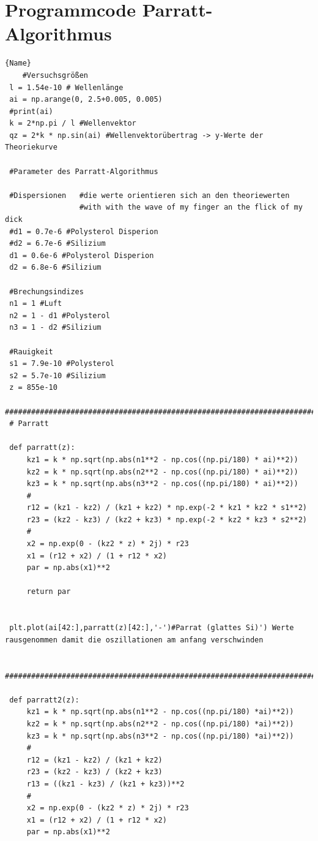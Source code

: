 \section{Programmcode Parratt-Algorithmus}
\begin{lstlisting}{Name}
    #Versuchsgrößen
 l = 1.54e-10 # Wellenlänge
 ai = np.arange(0, 2.5+0.005, 0.005)
 #print(ai)
 k = 2*np.pi / l #Wellenvektor
 qz = 2*k * np.sin(ai) #Wellenvektorübertrag -> y-Werte der Theoriekurve
 
 #Parameter des Parratt-Algorithmus
 
 #Dispersionen   #die werte orientieren sich an den theoriewerten
                 #with with the wave of my finger an the flick of my dick
 #d1 = 0.7e-6 #Polysterol Disperion
 #d2 = 6.7e-6 #Silizium 
 d1 = 0.6e-6 #Polysterol Disperion
 d2 = 6.8e-6 #Silizium 
 
 #Brechungsindizes
 n1 = 1 #Luft
 n2 = 1 - d1 #Polysterol
 n3 = 1 - d2 #Silizium
 
 #Rauigkeit
 s1 = 7.9e-10 #Polysterol 
 s2 = 5.7e-10 #Silizium 
 z = 855e-10 
 ########################################################################################################
 # Parratt
 
 def parratt(z):
     kz1 = k * np.sqrt(np.abs(n1**2 - np.cos((np.pi/180) * ai)**2))
     kz2 = k * np.sqrt(np.abs(n2**2 - np.cos((np.pi/180) * ai)**2))
     kz3 = k * np.sqrt(np.abs(n3**2 - np.cos((np.pi/180) * ai)**2))
     #
     r12 = (kz1 - kz2) / (kz1 + kz2) * np.exp(-2 * kz1 * kz2 * s1**2)
     r23 = (kz2 - kz3) / (kz2 + kz3) * np.exp(-2 * kz2 * kz3 * s2**2)
     #
     x2 = np.exp(0 - (kz2 * z) * 2j) * r23
     x1 = (r12 + x2) / (1 + r12 * x2)
     par = np.abs(x1)**2
 
     return par
 
 
 plt.plot(ai[42:],parratt(z)[42:],'-')#Parrat (glattes Si)') Werte rausgenommen damit die oszillationen am anfang verschwinden
 
 ########################################################################################################
 
 def parratt2(z):
     kz1 = k * np.sqrt(np.abs(n1**2 - np.cos((np.pi/180) *ai)**2))
     kz2 = k * np.sqrt(np.abs(n2**2 - np.cos((np.pi/180) *ai)**2))
     kz3 = k * np.sqrt(np.abs(n3**2 - np.cos((np.pi/180) *ai)**2))
     #
     r12 = (kz1 - kz2) / (kz1 + kz2)
     r23 = (kz2 - kz3) / (kz2 + kz3)
     r13 = ((kz1 - kz3) / (kz1 + kz3))**2
     #
     x2 = np.exp(0 - (kz2 * z) * 2j) * r23
     x1 = (r12 + x2) / (1 + r12 * x2)
     par = np.abs(x1)**2
     

\end{lstlisting}
